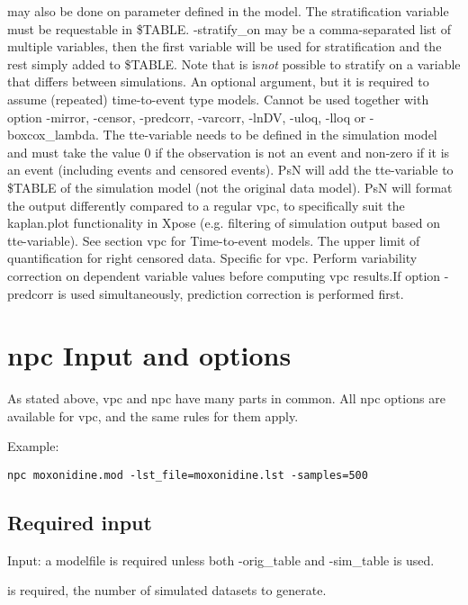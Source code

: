 \begin{optionlist}
may also be done on parameter defined in the model.
The stratification variable must be requestable in \$TABLE. -stratify\_on may be a comma-separated list of multiple variables, then the 
first variable will be used for stratification and the rest simply added to \$TABLE.
Note that is is\emph{not} possible to stratify on a variable that differs between simulations. 
\nextopt
{}
An optional argument, but it is required to assume (repeated) time-to-event type models. Cannot be used together with option -mirror, -censor, -predcorr, -varcorr,  -lnDV, -uloq, -lloq or -boxcox\_lambda. The tte-variable needs to be defined in the simulation model and must take the value 0 if the observation is not an event and non-zero if it is an event (including events and censored events). PsN will add the tte-variable to \mbox{\$TABLE} of the simulation model (not the original data model). PsN will format the output differently compared to a regular vpc, to specifically suit the kaplan.plot functionality in Xpose (e.g. filtering of simulation output based on tte-variable). See section vpc for Time-to-event models.   
\nextopt
{}
The upper limit of quantification for right censored data. Specific for vpc. 
\nextopt
{}
Perform variability correction on dependent variable values before computing vpc results.If option -predcorr is used simultaneously, prediction correction is performed first.
\nextopt
\end{optionlist}

\section{npc Input and options}
As stated above, vpc and npc have many parts in common. All npc options are available for vpc, and the same rules for them apply.

Example:
\begin{verbatim}
npc moxonidine.mod -lst_file=moxonidine.lst -samples=500 
\end{verbatim}

\subsection{Required input}
Input: a modelfile is required unless both -orig\_table and -sim\_table is used.

\begin{optionlist}
	is required, the number of simulated datasets to generate. 
	\nextopt
\end{optionlist}

